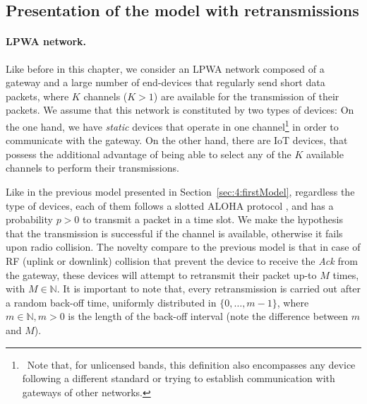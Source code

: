

\subsection{Presentation of the model with retransmissions}
\label{sub:43:model}

\paragraph{LPWA network.}

Like before in this chapter, we consider an LPWA network composed of a gateway and a large number of end-devices that regularly send short data packets, where $K$ channels ($K>1$) are available for the transmission of their packets.
%
We assume that this network is constituted by two types of devices:
On the one hand, we have \emph{static} devices that operate in one channel\footnote{~Note that, for unlicensed bands, this definition also encompasses any device following a different standard or trying to establish communication with gateways of other networks.} in order to communicate with the gateway.
%
On the other hand, there are  IoT devices, that possess the additional advantage of being able to select any of the $K$ available channels to perform their transmissions.

Like in the previous model presented in Section~\ref{sec:4:firstModel},
regardless the type of devices, each of them follows a slotted ALOHA protocol \cite{Roberts75}, and has a probability $p>0$ to transmit a packet in a time slot.
We make the hypothesis that the transmission is successful if the channel is available, otherwise it fails upon radio collision.
The novelty compare to the previous model is that
in case of RF (uplink or downlink) collision that prevent the device to receive the \emph{Ack} from the gateway,
these devices will attempt to retransmit their packet up-to $M$ times, with $M \in\mathbb{N}$.
It is important to note that, every retransmission is carried out after a random back-off time, uniformly distributed in $\{0, \dots, m-1\}$, where $m \in\mathbb{N}, m>0$ is the length of the back-off interval
(note the difference between $m$ and $M$).


